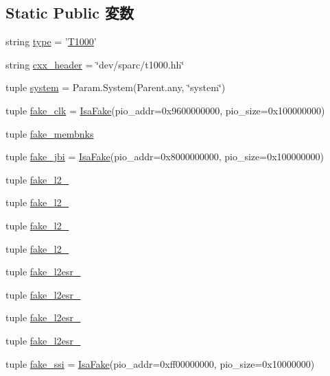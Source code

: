 \subsection*{Static Public 変数}
\begin{DoxyCompactItemize}
\item 
string \hyperlink{classT1000_1_1T1000_acce15679d830831b0bbe8ebc2a60b2ca}{type} = '\hyperlink{classT1000_1_1T1000}{T1000}'
\item 
string \hyperlink{classT1000_1_1T1000_a17da7064bc5c518791f0c891eff05fda}{cxx\_\-header} = \char`\"{}dev/sparc/t1000.hh\char`\"{}
\item 
tuple \hyperlink{classT1000_1_1T1000_ab737471139f5a296e5b26e8a0e1b0744}{system} = Param.System(Parent.any, \char`\"{}system\char`\"{})
\item 
tuple \hyperlink{classT1000_1_1T1000_a751958bc3d33af34410da835f53d0276}{fake\_\-clk} = \hyperlink{classIsaFake}{IsaFake}(pio\_\-addr=0x9600000000, pio\_\-size=0x100000000)
\item 
tuple \hyperlink{classT1000_1_1T1000_a8a303fdaceb9b90367c1ede9a5ae3c9e}{fake\_\-membnks}
\item 
tuple \hyperlink{classT1000_1_1T1000_a8c08b2b1e654aad4b0647b18ac56f4be}{fake\_\-jbi} = \hyperlink{classIsaFake}{IsaFake}(pio\_\-addr=0x8000000000, pio\_\-size=0x100000000)
\item 
tuple \hyperlink{classT1000_1_1T1000_a385271574ece269aa9f1c5cb030eb30c}{fake\_\-l2\_}
\item 
tuple \hyperlink{classT1000_1_1T1000_a47fc635cf3e601b8e234f4de3d2a6182}{fake\_\-l2\_}
\item 
tuple \hyperlink{classT1000_1_1T1000_abf537b9af546117b014da0e94a6df49f}{fake\_\-l2\_}
\item 
tuple \hyperlink{classT1000_1_1T1000_ad24d51d2884ce9ae204b4c0cfc8c70f4}{fake\_\-l2\_}
\item 
tuple \hyperlink{classT1000_1_1T1000_ac5267c667fdb38d55ec3ad9eed0663b0}{fake\_\-l2esr\_}
\item 
tuple \hyperlink{classT1000_1_1T1000_a50827ba8228ca2d96f9e06b176180c20}{fake\_\-l2esr\_}
\item 
tuple \hyperlink{classT1000_1_1T1000_ac5289087f2bf85185262d640415a3177}{fake\_\-l2esr\_}
\item 
tuple \hyperlink{classT1000_1_1T1000_affe1acd165521689a19e972386e3c79d}{fake\_\-l2esr\_}
\item 
tuple \hyperlink{classT1000_1_1T1000_a7a90b18da7616b6d322418d5e55db47d}{fake\_\-ssi} = \hyperlink{classIsaFake}{IsaFake}(pio\_\-addr=0xff00000000, pio\_\-size=0x10000000)

\end{DoxyCompactItemize}
